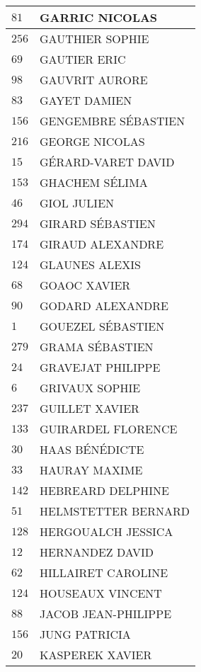 \begin{xltabular}{\linewidth}{|l|X|}
    \hline
    $81$ & GARRIC NICOLAS \\
    \hline
    $256$ & GAUTHIER SOPHIE \\
    \hline
    $69$ & GAUTIER ERIC \\
    \hline
    $98$ & GAUVRIT AURORE \\
    \hline
    $83$ & GAYET DAMIEN \\
    \hline
    $156$ & GENGEMBRE SÉBASTIEN \\
    \hline
    $216$ & GEORGE NICOLAS \\
    \hline
    $15$ & GÉRARD-VARET DAVID \\
    \hline
    $153$ & GHACHEM SÉLIMA \\
    \hline
    $46$ & GIOL JULIEN \\
    \hline
    $294$ & GIRARD SÉBASTIEN \\
    \hline
    $174$ & GIRAUD ALEXANDRE \\
    \hline
    $124$ & GLAUNES ALEXIS \\
    \hline
    $68$ & GOAOC XAVIER \\
    \hline
    $90$ & GODARD ALEXANDRE \\
    \hline
    $1$ & GOUEZEL SÉBASTIEN \\
    \hline
    $279$ & GRAMA SÉBASTIEN \\
    \hline
    $24$ & GRAVEJAT PHILIPPE \\
    \hline
    $6$ & GRIVAUX SOPHIE \\
    \hline
    $237$ & GUILLET XAVIER \\
    \hline
    $133$ & GUIRARDEL FLORENCE \\
    \hline
    $30$ & HAAS BÉNÉDICTE \\
    \hline
    $33$ & HAURAY MAXIME \\
    \hline
    $142$ & HEBREARD DELPHINE \\
    \hline
    $51$ & HELMSTETTER BERNARD \\
    \hline
    $128$ & HERGOUALCH JESSICA \\
    \hline
    $12$ & HERNANDEZ DAVID \\
    \hline
    $62$ & HILLAIRET CAROLINE \\
    \hline
    $124$ & HOUSEAUX VINCENT \\
    \hline
    $88$ & JACOB JEAN-PHILIPPE \\
    \hline
    $156$ & JUNG PATRICIA \\
    \hline
    $20$ & KASPEREK XAVIER \\

\end{xltabular}
